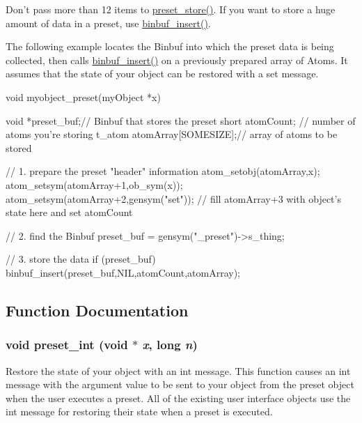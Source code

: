 Don’t pass more than 12 items to \hyperlink{group__presets_ga5f6d86fdc24e371604b764e7581a4fcb}{preset\_\-store()}. If you want to store a huge amount of data in a preset, use \hyperlink{group__binbuf_gad8f2272c95a8e89f22f1a9c67272af5e}{binbuf\_\-insert()}.

The following example locates the Binbuf into which the preset data is being collected, then calls \hyperlink{group__binbuf_gad8f2272c95a8e89f22f1a9c67272af5e}{binbuf\_\-insert()} on a previously prepared array of Atoms. It assumes that the state of your object can be restored with a set message.


\begin{DoxyCode}
    void myobject_preset(myObject *x) 
    { 
        void *preset_buf;// Binbuf that stores the preset
        short atomCount; // number of atoms you’re storing
        t_atom atomArray[SOMESIZE];// array of atoms to be stored
    
        // 1. prepare the preset "header" information
        atom_setobj(atomArray,x); 
        atom_setsym(atomArray+1,ob_sym(x)); 
        atom_setsym(atomArray+2,gensym("set")); 
        // fill atomArray+3 with object's state here and set atomCount
    
        // 2. find the Binbuf
        preset_buf = gensym("_preset")->s_thing;
    
        // 3. store the data 
        if (preset_buf) { 
            binbuf_insert(preset_buf,NIL,atomCount,atomArray); 
        } 
    }
\end{DoxyCode}
 

\subsection{Function Documentation}
\hypertarget{group__presets_gaf1da6073fef8e3f896602cf7f9738a23}{
\subsubsection[{preset\_\-int}]{\setlength{\rightskip}{0pt plus 5cm}void preset\_\-int (void $\ast$ {\em x}, \/  long {\em n})}}
\label{group__presets_gaf1da6073fef8e3f896602cf7f9738a23}


Restore the state of your object with an int message. This function causes an int message with the argument value to be sent to your object from the preset object when the user executes a preset. All of the existing user interface objects use the int message for restoring their state when a preset is executed.


